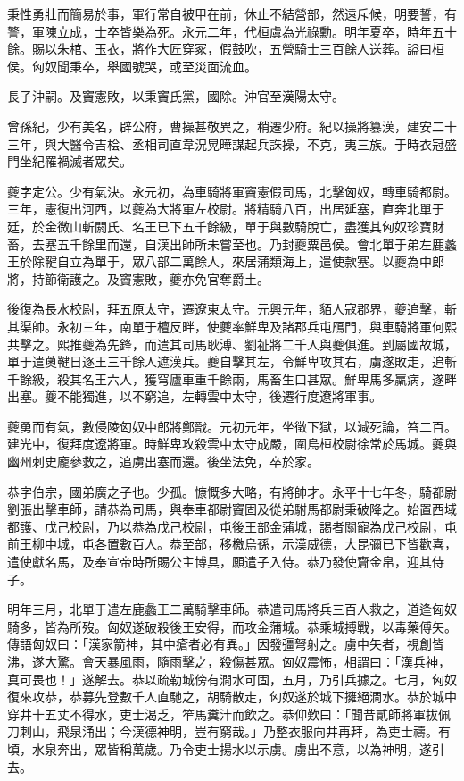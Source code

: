 \begin{pinyinscope}
秉性勇壯而簡易於事，軍行常自被甲在前，休止不結營部，然遠斥候，明要誓，有警，軍陳立成，士卒皆樂為死。永元二年，代桓虞為光祿勳。明年夏卒，時年五十餘。賜以朱棺、玉衣，將作大匠穿冢，假鼓吹，五營騎士三百餘人送葬。謚曰桓侯。匈奴聞秉卒，舉國號哭，或至災面流血。

長子沖嗣。及竇憲敗，以秉竇氏黨，國除。沖官至漢陽太守。

曾孫紀，少有美名，辟公府，曹操甚敬異之，稍遷少府。紀以操將篡漢，建安二十三年，與大醫令吉桧、丞相司直韋況晃曄謀起兵誅操，不克，夷三族。于時衣冠盛門坐紀罹禍滅者眾矣。

夔字定公。少有氣決。永元初，為車騎將軍竇憲假司馬，北擊匈奴，轉車騎都尉。三年，憲復出河西，以夔為大將軍左校尉。將精騎八百，出居延塞，直奔北單于廷，於金微山斬閼氏、名王已下五千餘級，單于與數騎脫亡，盡獲其匈奴珍寶財畜，去塞五千餘里而還，自漢出師所未嘗至也。乃封夔粟邑侯。會北單于弟左鹿蠡王於除鞬自立為單于，眾八部二萬餘人，來居蒲類海上，遣使款塞。以夔為中郎將，持節衛護之。及竇憲敗，夔亦免官奪爵土。

後復為長水校尉，拜五原太守，遷遼東太守。元興元年，貊人寇郡界，夔追擊，斬其渠帥。永初三年，南單于檀反畔，使夔率鮮卑及諸郡兵屯鴈門，與車騎將軍何熙共擊之。熙推夔為先鋒，而遣其司馬耿溥、劉祉將二千人與夔俱進。到屬國故城，單于遣薁鞬日逐王三千餘人遮漢兵。夔自擊其左，令鮮卑攻其右，虜遂敗走，追斬千餘級，殺其名王六人，獲穹廬車重千餘兩，馬畜生口甚眾。鮮卑馬多羸病，遂畔出塞。夔不能獨進，以不窮追，左轉雲中太守，後遷行度遼將軍事。

夔勇而有氣，數侵陵匈奴中郎將鄭戩。元初元年，坐徵下獄，以減死論，笞二百。建光中，復拜度遼將軍。時鮮卑攻殺雲中太守成嚴，圍烏桓校尉徐常於馬城。夔與幽州刺史龐參救之，追虜出塞而還。後坐法免，卒於家。

恭字伯宗，國弟廣之子也。少孤。慷慨多大略，有將帥才。永平十七年冬，騎都尉劉張出擊車師，請恭為司馬，與奉車都尉竇固及從弟駙馬都尉秉破降之。始置西域都護、戊己校尉，乃以恭為戊己校尉，屯後王部金蒲城，謁者關寵為戊己校尉，屯前王柳中城，屯各置數百人。恭至部，移檄烏孫，示漢威德，大昆彌已下皆歡喜，遣使獻名馬，及奉宣帝時所賜公主博具，願遣子入侍。恭乃發使齎金帛，迎其侍子。

明年三月，北單于遣左鹿蠡王二萬騎擊車師。恭遣司馬將兵三百人救之，道逢匈奴騎多，皆為所歿。匈奴遂破殺後王安得，而攻金蒲城。恭乘城搏戰，以毒藥傅矢。傳語匈奴曰：「漢家箭神，其中瘡者必有異。」因發彊弩射之。虜中矢者，視創皆沸，遂大驚。會天暴風雨，隨雨擊之，殺傷甚眾。匈奴震怖，相謂曰：「漢兵神，真可畏也！」遂解去。恭以疏勒城傍有澗水可固，五月，乃引兵據之。七月，匈奴復來攻恭，恭募先登數千人直馳之，胡騎散走，匈奴遂於城下擁絕澗水。恭於城中穿井十五丈不得水，吏士渴乏，笮馬糞汁而飲之。恭仰歎曰：「聞昔貳師將軍拔佩刀刺山，飛泉涌出；今漢德神明，豈有窮哉。」乃整衣服向井再拜，為吏士禱。有頃，水泉奔出，眾皆稱萬歲。乃令吏士揚水以示虜。虜出不意，以為神明，遂引去。


\end{pinyinscope}
